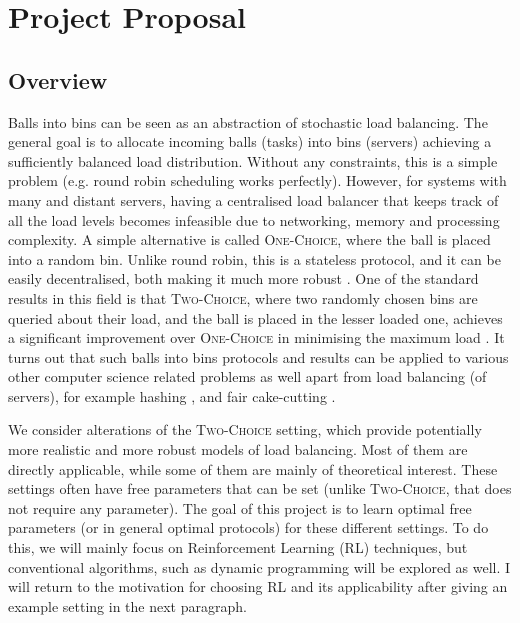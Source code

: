 \chapter{Project Proposal}\label{proposal} 

\section*{Overview}

Balls into bins can be seen as an abstraction of stochastic load balancing. The general goal is to allocate incoming balls (tasks) into bins (servers) achieving a sufficiently balanced load distribution. Without any constraints, this is a simple problem (e.g. round robin scheduling works  perfectly). However, for systems with many and distant servers, having a centralised load balancer that keeps track of all the load levels becomes infeasible due to networking, memory and processing complexity.  A simple alternative is called \textsc{One-Choice}, where the ball is placed into a random bin. Unlike round robin, this is a stateless protocol, and it can be easily decentralised, both making it much more robust \cite{nasir2015power}. One of the standard results in this field is that \textsc{Two-Choice}, where two randomly chosen bins are queried about their load, and the ball is placed in the lesser loaded one, achieves a significant improvement over \textsc{One-Choice} in minimising the maximum load \cite{azar1999twochoice}. It turns out that such balls into bins protocols and results can be applied to various other computer science related problems as well apart from load balancing (of servers), for example hashing \cite{dahlgaard2016power}, and fair cake-cutting \cite{edmonds2006balanced}.

We consider alterations of the \textsc{Two-Choice} setting, which provide potentially more realistic and more robust models of load balancing. Most of them are directly applicable, while some of them are mainly of theoretical interest. These settings often have free parameters that can be set (unlike \textsc{Two-Choice}, that does not require any parameter). 
The goal of this project is to learn optimal free parameters (or in general optimal protocols) for these different settings. To do this, we will mainly focus on Reinforcement Learning (RL) techniques, but conventional algorithms, such as dynamic programming will be explored as well. I will return to the motivation for choosing RL and its applicability after giving an example setting in the next paragraph.

